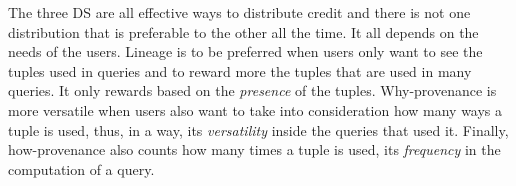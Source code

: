 The three DS are all effective ways to distribute credit and there is not one distribution that is preferable to the other all the time. It all depends on the needs of the users. 
Lineage is to be preferred when users only want to see the tuples used in queries and to reward more the tuples that are used in many queries. It only rewards based on the \emph{presence} of the tuples. 
Why-provenance is more versatile when users also want to take into consideration how many ways a tuple is used, thus, in a way, its \emph{versatility} inside the queries that used it.
Finally, how-provenance also counts how many times a tuple is used, its \emph{frequency} in the computation of a query. 